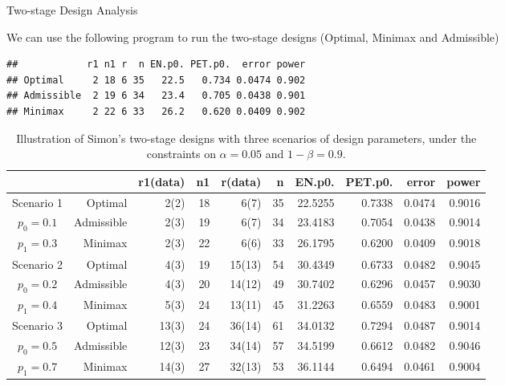 \begin{frame}[fragile]{Two-stage Design Analysis}

We can use the following program to run the two-stage designs (Optimal,
Minimax and Admissible) \tiny

\begin{Shaded}
\begin{Highlighting}[]
\NormalTok{(}\NormalTok{, }\NormalTok{, }\NormalTok{, } \NormalTok{, } \NormalTok{)}
\end{Highlighting}
\end{Shaded}

\begin{verbatim}
##            r1 n1 r  n EN.p0. PET.p0.  error power
## Optimal     2 18 6 35   22.5   0.734 0.0474 0.902
## Admissible  2 19 6 34   23.4   0.705 0.0438 0.901
## Minimax     2 22 6 33   26.2   0.620 0.0409 0.902
\end{verbatim}

\begin{table}[ht]  \fontsize{7}{9}\selectfont
\centering
\begin{tabular}{crrrrrrrrr}
  \hline
 & & r1(data) & n1 & r(data) & n & EN.p0. & PET.p0. & error & power \\ 
  \hline
Scenario 1 &  Optimal & 2(2) & 18 & 6(7) & 35 & 22.5255 & 0.7338 & 0.0474 & 0.9016 \\ 
$p_0=0.1$ & Admissible & 2(3) & 19 & 6(7) & 34 & 23.4183 & 0.7054 & 0.0438 & 0.9014 \\ 
$p_1=0.3$ & Minimax & 2(3) & 22 & 6(6) & 33 & 26.1795 & 0.6200 & 0.0409 & 0.9018 \\ 
   \hline
Scenario 2 & Optimal & 4(3) & 19 & 15(13) & 54 & 30.4349 & 0.6733 & 0.0482 & 0.9045 \\ 
$p_0=0.2$ &  Admissible & 4(3) & 20 & 14(12) & 49 & 30.7402 & 0.6296 & 0.0457 & 0.9030 \\ 
$p_1=0.4$ &  Minimax & 5(3) & 24 & 13(11) & 45 & 31.2263 & 0.6559 & 0.0483 & 0.9001 \\ 
   \hline  
Scenario 3 &   Optimal & 13(3) & 24 & 36(14) & 61 & 34.0132 & 0.7294 & 0.0487 & 0.9014 \\ 
$p_0=0.5$ &  Admissible & 12(3) & 23 & 34(14) & 57 & 34.5199 & 0.6612 & 0.0482 & 0.9046 \\ 
$p_1=0.7$ &  Minimax & 14(3) & 27 & 32(13) & 53 & 36.1144 & 0.6494 & 0.0461 & 0.9004 \\ 
   \hline
\end{tabular}
\tiny{\caption{Illustration of Simon's two-stage designs with three scenarios of design parameters, under the constraints on $\alpha=0.05$ and $1-\beta=0.9$.}} 
\end{table}

\end{frame}

